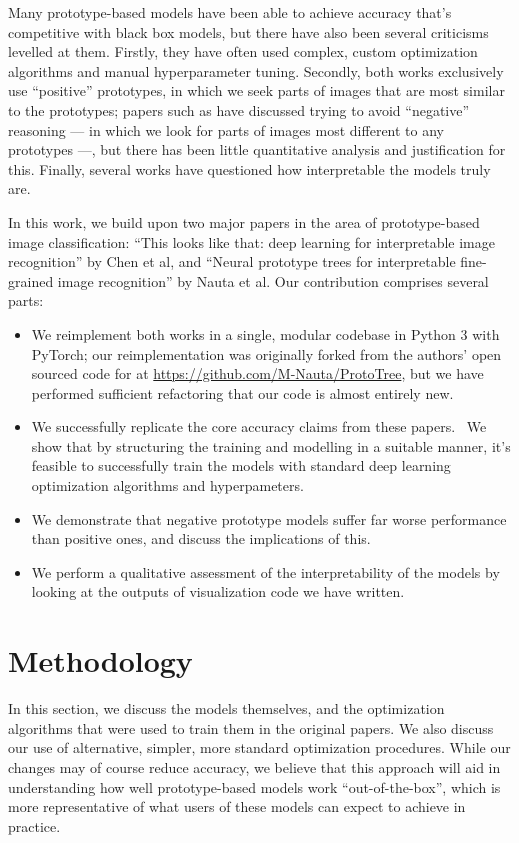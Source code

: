 \documentclass{rescience}
\begin{document}
Many prototype-based models have been able to achieve accuracy that's competitive with black box models, but there have also been several criticisms levelled at them. Firstly, they have often used complex, custom optimization algorithms and manual hyperparameter tuning. Secondly, both works exclusively use ``positive'' prototypes, in which we seek parts of images that are most similar to the prototypes; papers such as \cite{donnelly2022deformable} have discussed trying to avoid ``negative'' reasoning --- in which we look for parts of images most different to any prototypes ---, but there has been little quantitative analysis and justification for this. Finally, several works have questioned how interpretable the models truly are.

In this work, we build upon two major papers in the area of prototype-based image classification: ``This looks like that: deep learning for interpretable image recognition'' by Chen et al,\cite{chen2019looks} and ``Neural prototype trees for interpretable fine-grained image recognition'' by Nauta et al.\cite{nauta2021neural} Our contribution comprises several parts:

\begin{itemize}
\item We reimplement both works in a single, modular codebase in Python 3 with PyTorch; our reimplementation was originally forked from the authors' open sourced code for \cite{nauta2021neural} at \url{https://github.com/M-Nauta/ProtoTree}, but we have performed sufficient refactoring that our code is almost entirely new.
\item We successfully replicate the core accuracy claims from these papers. \ We show that by structuring the training and modelling in a suitable manner, it's feasible to successfully train the models with standard deep learning optimization algorithms and hyperpameters.
\item We demonstrate that negative prototype models suffer far worse performance than positive ones, and discuss the implications of this.
\item We perform a qualitative assessment of the interpretability of the models by looking at the outputs of visualization code we have written.
\end{itemize}



\section{Methodology}
In this section, we discuss the models themselves, and the optimization algorithms that were used to train them in the original papers. We also discuss our use of alternative, simpler, more standard optimization procedures. While our changes may of course reduce accuracy, we believe that this approach will aid in understanding how well prototype-based models work ``out-of-the-box'', which is more representative of what users of these models can expect to achieve in practice.
\end{document}
